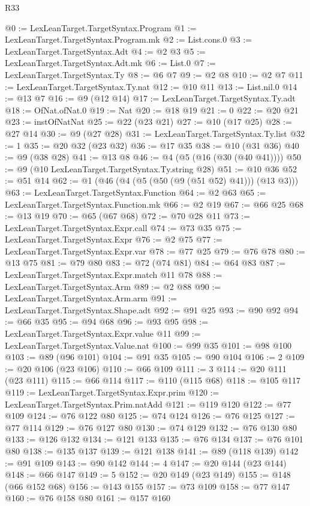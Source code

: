 \begin{lexlean}{R33}
\begin{coremodule}
@0 := LexLeanTarget.TargetSyntax.Program
@1 := LexLeanTarget.TargetSyntax.Program.mk
@2 := List.cons.{0}
@3 := LexLeanTarget.TargetSyntax.Adt
@4 := @2 @3
@5 := LexLeanTarget.TargetSyntax.Adt.mk
@6 := List.{0}
@7 := LexLeanTarget.TargetSyntax.Ty
@8 := @6 @7
@9 := @2 @8
@10 := @2 @7
@11 := LexLeanTarget.TargetSyntax.Ty.nat
@12 := @10 @11
@13 := List.nil.{0}
@14 := @13 @7
@16 := @9 (@12 @14)
@17 := LexLeanTarget.TargetSyntax.Ty.adt
@18 := OfNat.ofNat.{0}
@19 := Nat
@20 := @18 @19
@21 := 0
@22 := @20 @21
@23 := instOfNatNat
@25 := @22 (@23 @21)
@27 := @10 (@17 @25)
@28 := @27 @14
@30 := @9 (@27 @28)
@31 := LexLeanTarget.TargetSyntax.Ty.list
@32 := 1
@35 := @20 @32 (@23 @32)
@36 := @17 @35
@38 := @10 (@31 @36)
@40 := @9 (@38 @28)
@41 := @13 @8
@46 := @4 (@5 (@16 (@30 (@40 @41))))
@50 := @9 (@10 LexLeanTarget.TargetSyntax.Ty.string @28)
@51 := @10 @36
@52 := @51 @14
@62 := @1 (@46 (@4 (@5 (@50 (@9 (@51 @52) @41))) (@13 @3)))
@63 := LexLeanTarget.TargetSyntax.Function
@64 := @2 @63
@65 := LexLeanTarget.TargetSyntax.Function.mk
@66 := @2 @19
@67 := @66 @25
@68 := @13 @19
@70 := @65 (@67 @68)
@72 := @70 @28 @11
@73 := LexLeanTarget.TargetSyntax.Expr.call
@74 := @73 @35
@75 := LexLeanTarget.TargetSyntax.Expr
@76 := @2 @75
@77 := LexLeanTarget.TargetSyntax.Expr.var
@78 := @77 @25
@79 := @76 @78
@80 := @13 @75
@81 := @79 @80
@83 := @72 (@74 @81)
@84 := @64 @83
@87 := LexLeanTarget.TargetSyntax.Expr.match @11 @78
@88 := LexLeanTarget.TargetSyntax.Arm
@89 := @2 @88
@90 := LexLeanTarget.TargetSyntax.Arm.arm
@91 := LexLeanTarget.TargetSyntax.Shape.adt
@92 := @91 @25
@93 := @90 @92
@94 := @66 @35
@95 := @94 @68
@96 := @93 @95
@98 := LexLeanTarget.TargetSyntax.Expr.value @11
@99 := LexLeanTarget.TargetSyntax.Value.nat
@100 := @99 @35
@101 := @98 @100
@103 := @89 (@96 @101)
@104 := @91 @35
@105 := @90 @104
@106 := 2
@109 := @20 @106 (@23 @106)
@110 := @66 @109
@111 := 3
@114 := @20 @111 (@23 @111)
@115 := @66 @114
@117 := @110 (@115 @68)
@118 := @105 @117
@119 := LexLeanTarget.TargetSyntax.Expr.prim
@120 := LexLeanTarget.TargetSyntax.Prim.natAdd
@121 := @119 @120
@122 := @77 @109
@124 := @76 @122 @80
@125 := @74 @124
@126 := @76 @125
@127 := @77 @114
@129 := @76 @127 @80
@130 := @74 @129
@132 := @76 @130 @80
@133 := @126 @132
@134 := @121 @133
@135 := @76 @134
@137 := @76 @101 @80
@138 := @135 @137
@139 := @121 @138
@141 := @89 (@118 @139)
@142 := @91 @109
@143 := @90 @142
@144 := 4
@147 := @20 @144 (@23 @144)
@148 := @66 @147
@149 := 5
@152 := @20 @149 (@23 @149)
@155 := @148 (@66 @152 @68)
@156 := @143 @155
@157 := @73 @109
@158 := @77 @147
@160 := @76 @158 @80
@161 := @157 @160

\end{coremodule}
\end{lexlean}
